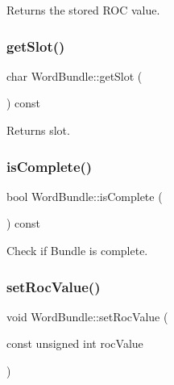 Returns the stored R\+OC value. 

\mbox{\label{class_word_bundle_a4a8540008b739e4e4b94e665c2e24991}} 
\subsubsection{\texorpdfstring{get\+Slot()}{getSlot()}}
{\footnotesize\ttfamily char Word\+Bundle\+::get\+Slot (\begin{DoxyParamCaption}{ }\end{DoxyParamCaption}) const\hspace{0.3cm}{\ttfamily [inline]}}



Returns slot. 

\mbox{\label{class_word_bundle_a0a817b8d4266b5c2418743bf46ef5dee}} 
\subsubsection{\texorpdfstring{is\+Complete()}{isComplete()}}
{\footnotesize\ttfamily bool Word\+Bundle\+::is\+Complete (\begin{DoxyParamCaption}{ }\end{DoxyParamCaption}) const\hspace{0.3cm}{\ttfamily [inline]}}



Check if Bundle is complete. 

\mbox{\label{class_word_bundle_a15e13fdd7380c72be2f42013560d62c3}} 
\subsubsection{\texorpdfstring{set\+Roc\+Value()}{setRocValue()}}
{\footnotesize\ttfamily void Word\+Bundle\+::set\+Roc\+Value (\begin{DoxyParamCaption}\item[{const unsigned int}]{roc\+Value }\end{DoxyParamCaption})\hspace{0.3cm}{\ttfamily [inline]}}




